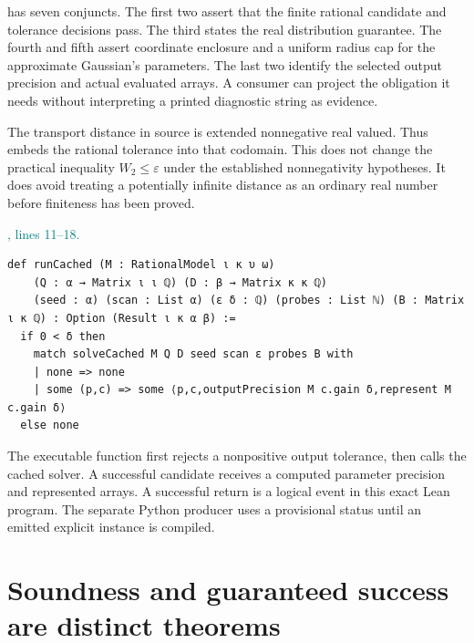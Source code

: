 \documentclass[11pt]{article}\usepackage{needspace}\renewcommand{\paperkind}{Lean companion}\setlength{\parskip}{0.35em}
\begin{document}
 has seven conjuncts. The first two assert that the finite rational candidate and tolerance decisions pass. The third states the real distribution guarantee. The fourth and fifth assert coordinate enclosure and a uniform radius cap for the approximate Gaussian's parameters. The last two identify the selected output precision and actual evaluated arrays. A consumer can project the obligation it needs without interpreting a printed diagnostic string as evidence.

The transport distance in source is extended nonnegative real valued. Thus  embeds the rational tolerance into that codomain. This does not change the practical inequality $W_2\le\varepsilon$ under the established nonnegativity hypotheses. It does avoid treating a potentially infinite distance as an ordinary real number before finiteness has been proved.



{\small\textcolor{teal}{, lines 11--18.}\par}

\begin{lstlisting}[style=BayesSource]
def runCached (M : RationalModel ι κ υ ω)
    (Q : α → Matrix ι ι ℚ) (D : β → Matrix κ κ ℚ)
    (seed : α) (scan : List α) (ε δ : ℚ) (probes : List ℕ) (B : Matrix ι κ ℚ) : Option (Result ι κ α β) :=
  if 0 < δ then
    match solveCached M Q D seed scan ε probes B with
    | none => none
    | some (p,c) => some ⟨p,c,outputPrecision M c.gain δ,represent M c.gain δ⟩
  else none
\end{lstlisting}

The executable function first rejects a nonpositive output tolerance, then calls the cached solver. A successful candidate receives a computed parameter precision and represented arrays. A successful return is a logical event in this exact Lean program. The separate Python producer uses a provisional status until an emitted explicit instance is compiled.

\section{Soundness and guaranteed success are distinct theorems}
\end{document}
